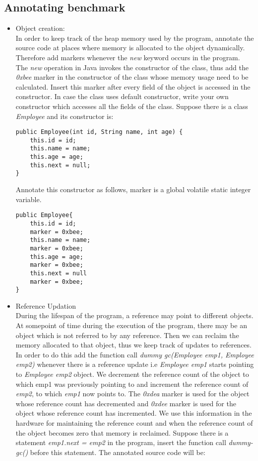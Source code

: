 \documentclass[a4paper]{article}
\begin{document}
\subsection{Annotating benchmark}
\begin{itemize}
\item Object creation:\\
In order to keep track of the heap memory used by the program, annotate the source
code at places where memory is allocated to the object dynamically. Therefore add
markers whenever the \textit{new} keyword occurs in the program. The \textit{new} operation in Java invokes the constructor of the class, thus add the \textit{0xbee} marker in the constructor of the class whose memory usage need to be calculated. Insert this marker after every field of the object is accessed in the constructor. In case the class uses default constructor, write your own constructor which accesses all the fields of the class. Suppose there is a class \textit{Employee} and its constructor is:
\begin{verbatim}
public Employee(int id, String name, int age) {
    this.id = id;
    this.name = name;
    this.age = age;
    this.next = null;
}
\end{verbatim}
Annotate this constructor as follows, marker is a global volatile static integer variable.
\begin{verbatim}
public Employee{
    this.id = id;
    marker = 0xbee;
    this.name = name;
    marker = 0xbee;
    this.age = age;
    marker = 0xbee;
    this.next = null
    marker = 0xbee;
}
\end{verbatim}

\item Reference Updation\\
During the lifespan of the program, a reference may point to different objects. At somepoint of time during the execution of the program, there may be an object which is not
referred to by any reference. Then we can reclaim the memory allocated to that object,
thus we keep track of updates to references. In order to do this add the function call
\textit{dummy gc(Employee emp1, Employee emp2)} whenever there is a reference update i.e \textit{Employee emp1} starts pointing to \textit{Employee emp2} object. We decrement the reference count of the object to which emp1 was previously pointing to and increment the reference count of \textit{emp2}, to which \textit{emp1} now points to. The \textit{0xdea} marker is used for the object whose reference count has decremented and \textit{0xdee} marker is used for the object whose reference count has incremented. We use this information in the hardware for maintaining the reference count and when the reference count of the object becomes zero that memory is reclaimed. Suppose
there is a statement \textit{emp1.next = emp2	} in the program, insert the function call
\textit{dummy-gc()} before this statement. The annotated source code will be:


\end{itemize}
\end{document}
